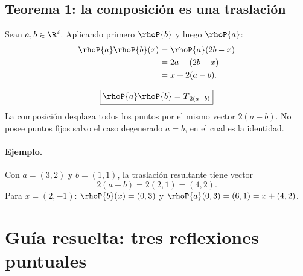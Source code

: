 \subsection{Teorema 1: la composición es una traslación}

Sean \(a,b\in\R^2\). Aplicando primero \(\rhoP{b}\) y luego \(\rhoP{a}\):
\[
\begin{aligned}
  \rhoP{a}\rhoP{b}(x)
  &=\rhoP{a}(2b-x)\\
  &=2a-(2b-x)\\
  &=x+2(a-b).
\end{aligned}
\]

\begin{resultado}[Conclusión]
\[
  \boxed{\rhoP{a}\rhoP{b}=T_{\,2(a-b)}}
\]
La composición desplaza todos los puntos por el mismo vector \(2(a-b)\). No posee puntos
fijos salvo el caso degenerado \(a=b\), en el cual es la identidad.
\end{resultado}

\begin{center}
\end{center}

\paragraph{Ejemplo.}
Con \(a=(3,2)\) y \(b=(1,1)\), la traslación resultante tiene vector
\[
  2(a-b)=2(2,1)=(4,2).
\]
Para \(x=(2,-1)\): \(\rhoP{b}(x)=(0,3)\) y
\(\rhoP{a}(0,3)=(6,1)=x+(4,2)\).

\section{Guía resuelta: tres reflexiones puntuales}

